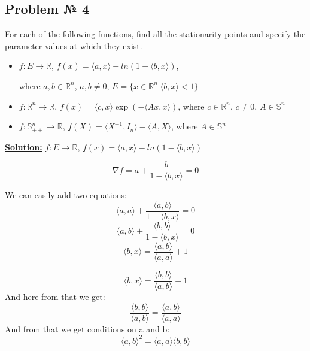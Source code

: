 \subsection{Problem № 4} 
For each of the following functions, find all the stationarity points and specify the parameter values
at which they exist.
\begin{itemize}
    \item $f: E \xrightarrow{} \mathbb{R}$, $f(x) = \langle a, x \rangle - ln(1 - \langle b, x \rangle)$, 
    
    where $a, b \in \mathbb{R}^n$, $a, b \not= 0$, $E = \{ x \in \mathbb{R}^n | \langle b, x \rangle < 1 \}$
    \item $f: \mathbb{R}^n \xrightarrow{} \mathbb{R}$, $f(x) = \langle c, x \rangle \exp(-\langle Ax, x \rangle)$, 
    where $c \in \mathbb{R}^n$, $c \not= 0$, $A \in \mathbb{S}^n$
    \item $f: \mathbb{S}_{++}^n \xrightarrow{} \mathbb{R}$, $f(X) = \langle X^{-1}, I_n \rangle -\langle A, X \rangle$, 
    where $A \in \mathbb{S}^n$
\end{itemize}

\underline{\textbf{Solution:}} 
$f: E \xrightarrow{} \mathbb{R}$, $f(x) = \langle a, x \rangle - ln(1 - \langle b, x \rangle)$

\begin{equation*}
    \nabla f = a + \frac{b}{1-\langle b, x \rangle} = 0
\end{equation*}

We can easily add two equations:
\begin{equation*}
    \langle a, a \rangle + \frac{\langle a, b \rangle }{1-\langle b, x \rangle} = 0
\end{equation*}
\begin{equation*}
    \langle a, b \rangle + \frac{\langle b, b \rangle }{1-\langle b, x \rangle} = 0
\end{equation*}
\begin{equation*}
    \langle b, x \rangle = \frac{\langle a, b\rangle}{\langle a, a \rangle } + 1
\end{equation*}

\begin{equation*}
    \langle b, x \rangle = \frac{\langle b, b\rangle}{\langle a, b \rangle } + 1
\end{equation*}
And here from that we get:
\begin{equation*}
    \frac{\langle b, b\rangle}{\langle a, b \rangle } = \frac{\langle a, b\rangle}{\langle a, a \rangle }
\end{equation*}
And from that we get conditions on a and b:
\begin{equation*}
    \langle a, b \rangle^2 = \langle a , a\rangle \langle b, b \rangle
\end{equation*}

